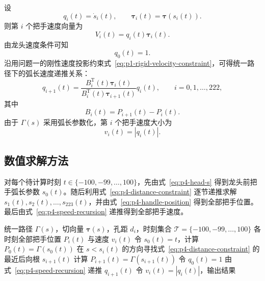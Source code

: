 设
\begin{equation}
    q_i(t)=\dot s_i(t),\qquad \bm\tau_i(t)=\bm\tau(s_i(t)).
    \label{eq:p4-qi-taui}
\end{equation}
则第 $i$ 个把手速度向量为
\begin{equation}
    V_i(t)=q_i(t)\bm\tau_i(t).
    \label{eq:p4-velocity-vector}
\end{equation}
由龙头速度条件可知
\begin{equation}
    q_0(t)=1.
    \label{eq:p4-q0}
\end{equation}
沿用问题一的刚性速度投影约束式~\eqref{eq:p1-rigid-velocity-constraint}，可得统一路径下的弧长速度递推关系：
\begin{equation}
    q_{i+1}(t)=
    \frac{B_i^{\mathrm T}(t)\bm\tau_i(t)}
    {B_i^{\mathrm T}(t)\bm\tau_{i+1}(t)}q_i(t),
    \qquad i=0,1,\ldots,222,
    \label{eq:p4-speed-recursion}
\end{equation}
其中
\begin{equation}
    B_i(t)=P_{i+1}(t)-P_i(t).
    \label{eq:p4-board-vector}
\end{equation}
由于 $\Gamma(s)$ 采用弧长参数化，第 $i$ 个把手速度大小为
\begin{equation}
    v_i(t)=|q_i(t)|.
    \label{eq:p4-speed-size}
\end{equation}

\subsection{数值求解方法}

对每个待计算时刻 $t\in\{-100,-99,\ldots,100\}$，先由式~\eqref{eq:p4-head-s} 得到龙头前把手弧长参数 $s_0(t)$。随后利用式~\eqref{eq:p4-distance-constraint} 逐节递推求解 $s_1(t),s_2(t),\ldots,s_{223}(t)$，并由式~\eqref{eq:p4-handle-position} 得到全部把手位置。最后由式~\eqref{eq:p4-speed-recursion} 递推得到全部把手速度。

\begin{algorithm}[H]
    \caption{问题四全队位置与速度求解算法}
    \label{alg:p4-solve}
    \begin{algorithmic}[1]
        \Require 统一路径 $\Gamma(s)$，切向量 $\bm\tau(s)$，孔距 $d_i$，时刻集合 $\mathcal T=\{-100,-99,\ldots,100\}$
        \Ensure 各时刻全部把手位置 $P_i(t)$ 与速度 $v_i(t)$
            \State 令 $s_0(t)=t$，计算 $P_0(t)=\Gamma(s_0(t))$
                \State 在 $s<s_i(t)$ 的方向寻找式~\eqref{eq:p4-distance-constraint} 的最近后向根 $s_{i+1}(t)$
                \State 计算 $P_{i+1}(t)=\Gamma(s_{i+1}(t))$
            \EndFor
            \State 令 $q_0(t)=1$
                \State 由式~\eqref{eq:p4-speed-recursion} 递推 $q_{i+1}(t)$
            \EndFor
            \State 令 $v_i(t)=|q_i(t)|$，输出结果
        \EndFor
    \end{algorithmic}
\end{algorithm}

